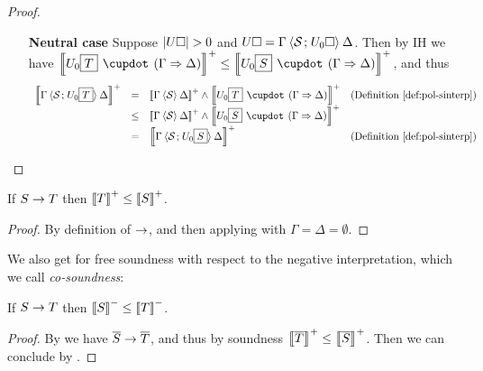 \begin{proof}
\begin{itemize}
    \item[\textbf{Neutral case}] Suppose $\left|U\square\right| > 0$ and $U\square =
    \Gamma \mathbin{\langle \mathcal{S} \;\!;\!\; U_0\square \rangle} \Delta$. Then by IH we have
    $\psint{U_0\select{T} \mix (\Gamma \seq \Delta)} \sement
    \psint{U_0\select{S} \mix (\Gamma \seq \Delta)}$, and thus
    $$
    \begin{array}{rcll}
      \psint{\Gamma \piq{\mathcal{S} \sep U_0\select{T}} \Delta}
      &=& \psint{\Gamma \piq{\mathcal{S}} \Delta} \land \psint{U_0\select{T} \mix (\Gamma \seq \Delta)} &\text{(\refdef{pol-sinterp})}\\
      &\sement& \psint{\Gamma \piq{\mathcal{S}} \Delta} \land \psint{U_0\select{S} \mix (\Gamma \seq \Delta)} &\\
      &=& \psint{\Gamma \piq{\mathcal{S} \sep U_0\select{S}} \Delta} &\text{(\refdef{pol-sinterp})}
    \end{array}
    $$
  \end{itemize}
\end{proof}

\begin{theorem}[Soundness]
  If $S \rightarrow T$ then $\left\llbracket T \right\rrbracket^+ \leq \left\llbracket S \right\rrbracket^+$.
\end{theorem}
\begin{proof}
  By definition of $\rightarrow$, and then applying 
  with $\Gamma = \Delta = \emptyset$.
\end{proof}

We also get for free soundness with respect to the negative interpretation,
which we call \emph{co-soundness}:

\begin{theorem}[Co-soundness]
  If $S \rightarrow T$ then $\left\llbracket S \right\rrbracket^- \leq \left\llbracket T \right\rrbracket^-$.
\end{theorem}
\begin{proof}
  By  we have $\overline{S} \rightarrow \overline{T}$,
  and thus by soundness $\left\llbracket \overline{T} \right\rrbracket^+ \leq \left\llbracket \overline{S} \right\rrbracket^+$. Then
  we can conclude by .
\end{proof}